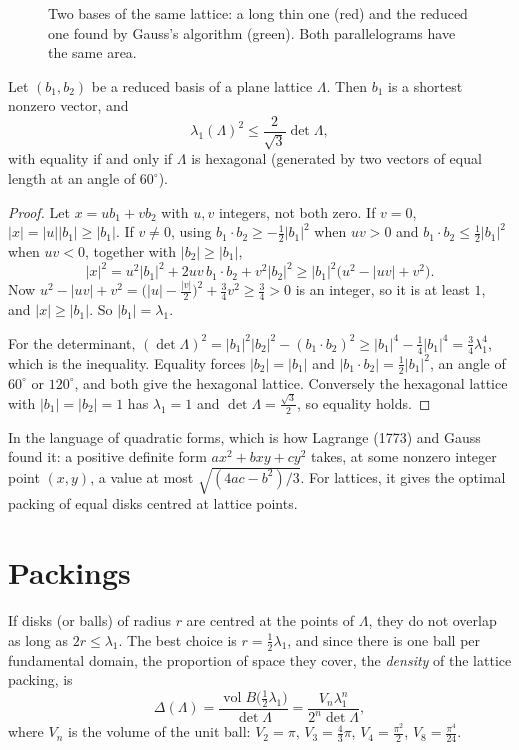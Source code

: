 \begin{figure}[ht]
\centering
{}
\caption{Two bases of the same lattice: a long thin one (red) and the reduced one found by Gauss's algorithm (green). Both parallelograms have the same
area.}
\label{geometry:fig:reduction}
\end{figure}

\begin{theorem}\label{geometry:thm:hermite2}
Let $(b_1,b_2)$ be a reduced basis of a plane lattice $\Lambda$. Then $b_1$ is a shortest nonzero vector, and
\[
\lambda_1(\Lambda)^2\le\frac2{\sqrt3}\det\Lambda,
\]
with equality if and only if $\Lambda$ is hexagonal (generated by two vectors of equal length at an angle of $60^\circ$).
\end{theorem}

\begin{proof}
Let $x=ub_1+vb_2$ with $u,v$ integers, not both zero. If $v=0$, $|x|=|u||b_1|\ge|b_1|$. If $v\ne0$, using $b_1\cdot b_2\ge-\frac12|b_1|^2$ when $uv>0$ and
$b_1\cdot b_2\le\frac12|b_1|^2$ when $uv<0$, together with $|b_2|\ge|b_1|$,
\[
|x|^2=u^2|b_1|^2+2uv\,b_1\cdot b_2+v^2|b_2|^2\ge|b_1|^2\bigl(u^2-|uv|+v^2\bigr).
\]
Now $u^2-|uv|+v^2=\bigl(|u|-\frac{|v|}2\bigr)^2+\frac34v^2\ge\frac34>0$ is an integer, so it is at least $1$, and $|x|\ge|b_1|$. So $|b_1|=\lambda_1$.

For the determinant, $(\det\Lambda)^2=|b_1|^2|b_2|^2-(b_1\cdot b_2)^2\ge|b_1|^4-\frac14|b_1|^4=\frac34\lambda_1^4$, which is the inequality. Equality forces
$|b_2|=|b_1|$ and $|b_1\cdot b_2|=\frac12|b_1|^2$, an angle of $60^\circ$ or $120^\circ$, and both give the hexagonal lattice. Conversely the hexagonal lattice
with $|b_1|=|b_2|=1$ has $\lambda_1=1$ and $\det\Lambda=\frac{\sqrt3}2$, so equality holds.
\end{proof}

In the language of quadratic forms, which is how Lagrange (1773) and Gauss found it: a positive definite form $ax^2+bxy+cy^2$ takes, at some
nonzero integer point $(x,y)$, a value at most $\sqrt{(4ac-b^2)/3}$. For lattices, it gives the optimal packing of equal disks centred at lattice points.

\section{Packings}

If disks (or balls) of radius $r$ are centred at the points of $\Lambda$, they do not overlap as long as $2r\le\lambda_1$. The best choice is
$r=\frac12\lambda_1$, and since there is one ball per fundamental domain, the proportion of space they cover, the \emph{density} of the lattice packing, is
\[
\Delta(\Lambda)=\frac{\operatorname{vol}B\bigl(\frac12\lambda_1\bigr)}{\det\Lambda}=\frac{V_n\lambda_1^n}{2^n\det\Lambda},
\]
where $V_n$ is the volume of the unit ball: $V_2=\pi$, $V_3=\frac43\pi$, $V_4=\frac{\pi^2}2$, $V_8=\frac{\pi^4}{24}$.

